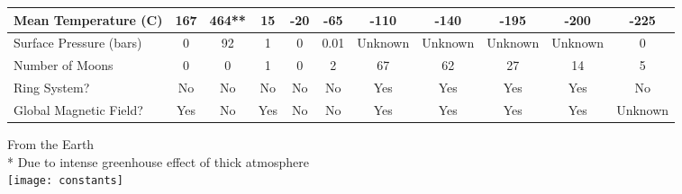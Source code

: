 \begin{center}
{\begin{tabular}{|p{2.5cm}|*{10}{c|}}
    Mean Temperature (C) &  167 &  464** &  15 &  -20 &  -65 &  -110 &  -140 &  -195 &  -200 &  -225 \\ \hline
    Surface Pressure (bars) &  0 &  92 &  1 &  0 &  0.01 &  Unknown &  Unknown &  Unknown &  Unknown &  0 \\ \hline
    Number of Moons &  0 &  0 &  1 &  0 &  2 &  67 &  62 &  27 &  14 &  5 \\ \hline
    Ring System? &  No &  No &  No &  No &  No &  Yes &  Yes &  Yes &  Yes &  No \\ \hline
    Global Magnetic Field? &  Yes &  No &  Yes &  No &  No &  Yes &  Yes &  Yes &  Yes &  Unknown \\ \hline
    \end{tabular}
}
\end{center}
{\footnotesize * From the Earth}\\
{\footnotesize ** Due to intense greenhouse effect of thick atmosphere}\\

\texttt{[image: constants]}
